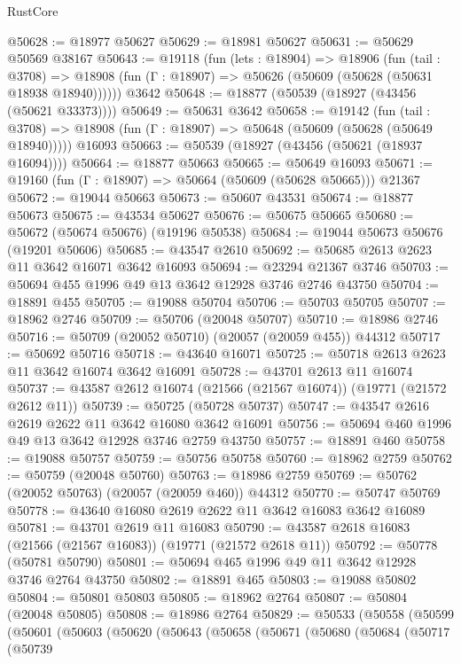 \begin{lexlean}{RustCore}
\begin{coremodule}
@50628 := @18977 @50627
@50629 := @18981 @50627
@50631 := @50629 @50569 @38167
@50643 := @19118
    (fun (lets : @18904) =>
    @18906
      (fun (tail : @3708) =>
      @18908 (fun (Γ : @18907) => @50626 (@50609 (@50628 (@50631 @18938 @18940))))))
    @3642
@50648 := @18877 (@50539 (@18927 (@43456 (@50621 @33373))))
@50649 := @50631 @3642
@50658 := @19142
    (fun (tail : @3708) => @18908 (fun (Γ : @18907) => @50648 (@50609 (@50628 (@50649 @18940)))))
    @16093
@50663 := @50539 (@18927 (@43456 (@50621 (@18937 @16094))))
@50664 := @18877 @50663
@50665 := @50649 @16093
@50671 := @19160 (fun (Γ : @18907) => @50664 (@50609 (@50628 @50665))) @21367
@50672 := @19044 @50663
@50673 := @50607 @43531
@50674 := @18877 @50673
@50675 := @43534 @50627
@50676 := @50675 @50665
@50680 := @50672 (@50674 @50676) (@19196 @50538)
@50684 := @19044 @50673 @50676 (@19201 @50606)
@50685 := @43547 @2610
@50692 := @50685 @2613 @2623 @11 @3642 @16071 @3642 @16093
@50694 := @23294 @21367 @3746
@50703 := @50694 @455 @1996 @49 @13 @3642 @12928 @3746 @2746 @43750
@50704 := @18891 @455
@50705 := @19088 @50704
@50706 := @50703 @50705
@50707 := @18962 @2746
@50709 := @50706 (@20048 @50707)
@50710 := @18986 @2746
@50716 := @50709 (@20052 @50710) (@20057 (@20059 @455)) @44312
@50717 := @50692 @50716
@50718 := @43640 @16071
@50725 := @50718 @2613 @2623 @11 @3642 @16074 @3642 @16091
@50728 := @43701 @2613 @11 @16074
@50737 := @43587 @2612 @16074 (@21566 (@21567 @16074)) (@19771 (@21572 @2612 @11))
@50739 := @50725 (@50728 @50737)
@50747 := @43547 @2616 @2619 @2622 @11 @3642 @16080 @3642 @16091
@50756 := @50694 @460 @1996 @49 @13 @3642 @12928 @3746 @2759 @43750
@50757 := @18891 @460
@50758 := @19088 @50757
@50759 := @50756 @50758
@50760 := @18962 @2759
@50762 := @50759 (@20048 @50760)
@50763 := @18986 @2759
@50769 := @50762 (@20052 @50763) (@20057 (@20059 @460)) @44312
@50770 := @50747 @50769
@50778 := @43640 @16080 @2619 @2622 @11 @3642 @16083 @3642 @16089
@50781 := @43701 @2619 @11 @16083
@50790 := @43587 @2618 @16083 (@21566 (@21567 @16083)) (@19771 (@21572 @2618 @11))
@50792 := @50778 (@50781 @50790)
@50801 := @50694 @465 @1996 @49 @11 @3642 @12928 @3746 @2764 @43750
@50802 := @18891 @465
@50803 := @19088 @50802
@50804 := @50801 @50803
@50805 := @18962 @2764
@50807 := @50804 (@20048 @50805)
@50808 := @18986 @2764
@50829 := @50533
    (@50558
      (@50599
        (@50601
          (@50603
            (@50620
              (@50643
                (@50658
                  (@50671
                    (@50680
                      (@50684
                        (@50717
                          (@50739

\end{coremodule}
\end{lexlean}
